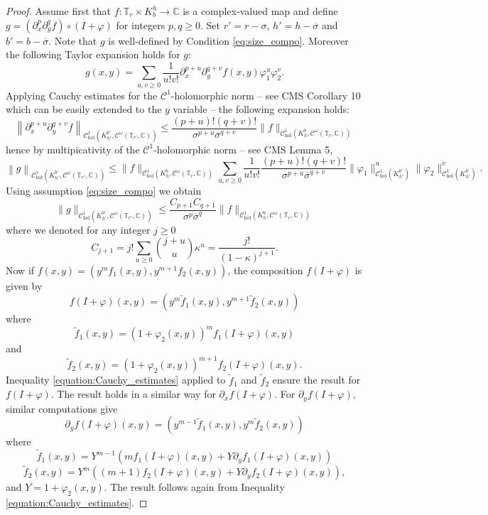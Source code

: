 \documentclass[10pt]{article}
\newcommand{\C}{\mathbb{C}}
\newcommand{\T}{\mathbb{T}}
\begin{document}
\begin{proof}
Assume first that $f:\T_{r}\times K_{b}^{h}\to \C$ is a complex-valued map and define $g=(\partial_x^p\partial_y^q f)\circ(I+\varphi)$ for integers $p,q\geq 0$. 
Set $r'=r-\sigma$, $h'=h-\overline\sigma$ and $b'=b-\overline\sigma$.
Note that $g$ is well-defined by Condition \eqref{eq:size_compo}.
Moreover the following Taylor expansion holds for $g$:
\[
g(x,y) = \sum_{u,v\geq 0}\frac{1}{u!v!}\partial_x^{p+u}\partial_y^{q+v} f(x,y)\varphi_1^u\varphi_2^v.
\]
Applying Cauchy estimates for the $\mathscr C^1$-holomorphic norm -- see CMS Corollary 10 which can be easily extended to the $y$ variable -- the following expansion holds:
\[
\left\|\partial_x^{p+u}\partial_y^{q+v} f\right\|_{\mathscr C_{\text{hol}}^1(K_{h'}^{b'},\mathscr C^{\omega}(\T_{r'},\C))} \leq \frac{(p+u)!(q+v)!}{\sigma^{p+u}\overline\sigma^{q+v}}\|f\|_{\mathscr C_{\text{hol}}^1(K_h^b,\mathscr C^{\omega}(\T_{r},\C))}
\]
hence by multipicativity of the $\mathscr C^1$-holomorphic norm -- see CMS Lemma 5,
\[
\left\|g\right\|_{\mathscr C_{\text{hol}}^1(K_{h'}^{b'},\mathscr C^{\omega}(\T_{r'},\C))}
\leq
\|f\|_{\mathscr C_{\text{hol}}^1(K_{h}^{b},\mathscr C^{\omega}(\T_{r},\C))}\sum_{u,v\geq 0}\frac{1}{u!v!}
\frac{(p+u)!(q+v)!}{\sigma^{p+u}\overline\sigma^{q+v}}
\|\varphi_1\|_{\mathscr C_{\text{hol}}^1(K_{h'}^{b'})}^u\|\varphi_2\|_{\mathscr C_{\text{hol}}^1(K_{h'}^{b'})}^v.
\]
Using assumption \eqref{eq:size_compo} we obtain
\begin{equation}
\label{equation:Cauchy_estimates}
\|g\|_{\mathscr C_{\text{hol}}^1(K_{h'}^{b'},\mathscr C^{\omega}(\T_{r'},\C))}\leq \frac{C_{p+1}C_{q+1}}{\sigma^p\overline\sigma^q}\|f\|_{\mathscr C_{\text{hol}}^1(K_{h}^{b},\mathscr C^{\omega}(\T_{r},\C))}
\end{equation}
where we denoted for any integer $j\geq 0$
\[
C_{j+1} = j!\sum_{u\geq 0}\binom{j+u}{u}\kappa^u = \frac{j!}{(1-\kappa)^{j+1}}.
\]
Now if 
$f(x,y) = (y^mf_1(x,y),y^{m+1}f_2(x,y))$, the composition $f(I+\varphi)$ is given by
\begin{equation}
\label{equation:differentiate_}
f(I+\varphi)(x,y) = \left(y^m\tilde f_1(x,y),y^{m+1}\tilde f_2(x,y)\right)
\end{equation}
where
\[
\tilde f_1(x,y) = (1+\varphi_2(x,y))^mf_1(I+\varphi)(x,y)
\]
and
\[
\tilde f_2(x,y) = (1+\varphi_2(x,y))^{m+1}f_2(I+\varphi)(x,y).
\]
Inequality \eqref{equation:Cauchy_estimates} applied to $\tilde f_1$ and $\tilde f_2$ ensure the result for $f(I+\varphi)$. The result holds in a similar way for $\partial_xf(I+\varphi)$. For $\partial_yf(I+\varphi)$, similar computations give
\begin{equation}
\label{equation:differentiate_y}
 \partial_yf(I+\varphi)(x,y) = \left(y^{m-1}\tilde f_1(x,y),y^{m}\tilde f_2(x,y)\right)
\end{equation}
where
\[
\tilde f_1(x,y) = Y^{m-1}(mf_1(I+\varphi)(x,y)+Y\partial_yf_1(I+\varphi)(x,y))
\]
\[
\tilde f_2(x,y) = Y^{m}((m+1)f_2(I+\varphi)(x,y)+Y\partial_yf_2(I+\varphi)(x,y)),
\]
and $Y = 1+\varphi_2(x,y)$. The result follows again from Inequality \eqref{equation:Cauchy_estimates}.
\end{proof}
\end{document}
